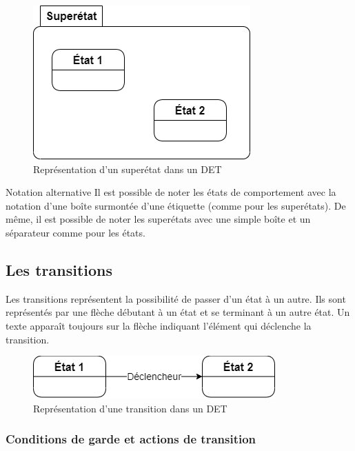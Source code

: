 \begin{figure}[H]
	\caption{Représentation d'un superétat dans un \acrshort{DET}}
	\centering
	\includegraphics[scale=0.4]{superetat.png}
\end{figure}

\begin{extra}{Notation alternative}
	Il est possible de noter les états  de comportement avec la notation d'une boîte surmontée d'une étiquette (comme pour les superétats). De même, il est possible de noter les superétats avec une simple boîte et un séparateur comme pour les états.
\end{extra}

\subsection{Les transitions}

Les transitions  représentent la possibilité de passer d'un état à un autre. Ils sont représentés par une flèche débutant à un état et se terminant à un autre état. Un texte apparaît toujours sur la flèche indiquant l'élément qui déclenche la transition. 

\begin{figure}[H]
	\caption{Représentation d'une transition dans un \acrshort{DET}}
	\centering
	\includegraphics[scale=0.45]{transition-simple.png}
\end{figure}

\subsubsection{Conditions de garde et actions de transition}

